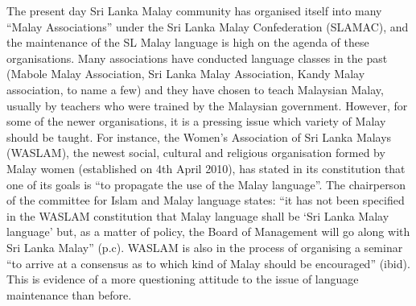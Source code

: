 The present day Sri Lanka Malay community has organised itself into many ``Malay Associations'' under the Sri Lanka Malay Confederation (SLAMAC), and the maintenance of the SL Malay language is high on the agenda of these organisations. Many associations have conducted language classes in the past (Mabole Malay Association, Sri Lanka Malay Association, Kandy Malay association, to name a few) and they have chosen to teach Malaysian Malay, usually by teachers who were trained by the Malaysian government. However, for some of the newer organisations, it is a pressing issue which variety of Malay should be taught. For instance, the Women's Association of Sri Lanka Malays (WASLAM), the newest  social, cultural and religious organisation formed by Malay women (established on 4th April 2010), has stated in its constitution that one of its goals is ``to propagate the use of the Malay language''. The chairperson of the committee for Islam and Malay language states: ``it has not been specified in the WASLAM constitution that Malay language shall be `Sri Lanka Malay language' but, as a matter of policy, the Board of Management will go along with Sri Lanka Malay'' (p.c).  WASLAM is also in the process of organising a seminar ``to arrive at a consensus as to which kind of Malay should be encouraged'' (ibid). This is evidence of a more questioning attitude to the issue of language maintenance than before. 

